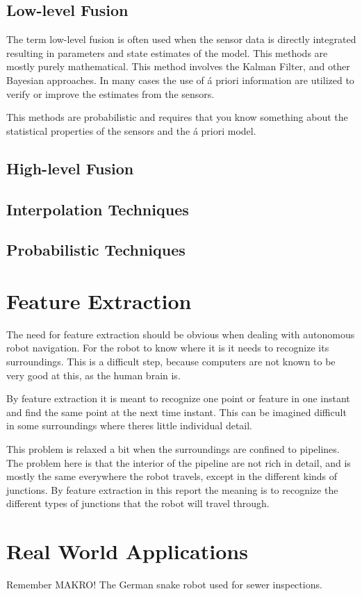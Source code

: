 \subsection{Low-level Fusion}
The term low-level fusion is often used when the sensor data is directly integrated
resulting in parameters and state estimates of the model. This methods are mostly purely
mathematical. This method involves the Kalman Filter, and other Bayesian approaches. In
many cases the use of \'a priori information are utilized to verify or improve the
estimates from the sensors.

This methods are probabilistic and requires that you know something about the
statistical properties of the sensors and the \'a priori model. 


\subsection{High-level Fusion}



\subsection{Interpolation Techniques}



\subsection{Probabilistic Techniques}



\section{Feature Extraction}
The need for feature extraction should be obvious when dealing with autonomous robot
navigation. For the robot to know where it is it needs to recognize its surroundings. This
is a difficult step, because computers are not known to be very good at this, as the human
brain is. 

By feature extraction it is meant to recognize one point or feature in one instant and
find the same point at the next time instant. This can be imagined difficult in some
surroundings where theres little individual detail. 

This problem is relaxed a bit when the surroundings are confined to pipelines. The problem
here is that the interior of the pipeline are not rich in detail, and is mostly the same
everywhere the robot travels, except in the different kinds of junctions. By feature
extraction in this report the meaning is to recognize the different types of junctions
that the robot will travel through. 

\cite{theilemann-breivik}




\section{Real World Applications}

Remember MAKRO! The German snake robot used for sewer inspections. 



